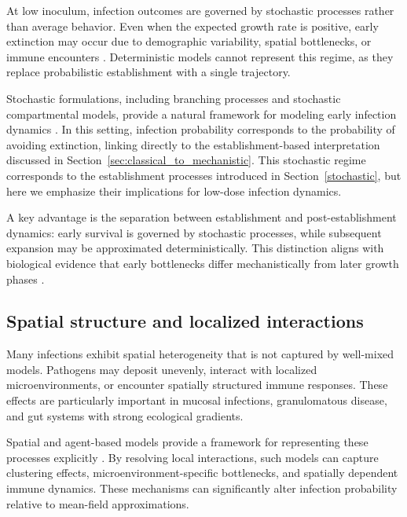 \documentclass[11pt]{article}
\begin{document}
At low inoculum, infection outcomes are governed by stochastic processes rather than average behavior. Even when the expected growth rate is positive, early extinction may occur due to demographic variability, spatial bottlenecks, or immune encounters \cite{Allen2010Stochastic,Mideo2008WithinHost}. Deterministic models cannot represent this regime, as they replace probabilistic establishment with a single trajectory.


Stochastic formulations, including branching processes and stochastic compartmental models, provide a natural framework for modeling early infection dynamics \cite{Allen2008BranchingEpi,Allen2010Stochastic}. In this setting, infection probability corresponds to the probability of avoiding extinction, linking directly to the establishment-based interpretation discussed in Section~\ref{sec:classical_to_mechanistic}. This stochastic regime corresponds to the establishment processes introduced in Section~\ref{stochastic}, but here we emphasize their implications for low-dose infection dynamics. 

A key advantage is the separation between establishment and post-establishment dynamics: early survival is governed by stochastic processes, while subsequent expansion may be approximated deterministically. This distinction aligns with biological evidence that early bottlenecks differ mechanistically from later growth phases \cite{Amato2022InfluenzaBottlenecks,Handel2009AcuteInfections,Pearson2011Bottleneck}.

\subsection{Spatial structure and localized interactions}

Many infections exhibit spatial heterogeneity that is not captured by well-mixed models. Pathogens may deposit unevenly, interact with localized microenvironments, or encounter spatially structured immune responses. These effects are particularly important in mucosal infections, granulomatous disease, and gut systems with strong ecological gradients.

Spatial and agent-based models provide a framework for representing these processes explicitly \cite{An2001,Sego2010SpatialInfluenza,SegoviaJuarez2004TB}. By resolving local interactions, such models can capture clustering effects, microenvironment-specific bottlenecks, and spatially dependent immune dynamics. These mechanisms can significantly alter infection probability relative to mean-field approximations.
\end{document}
